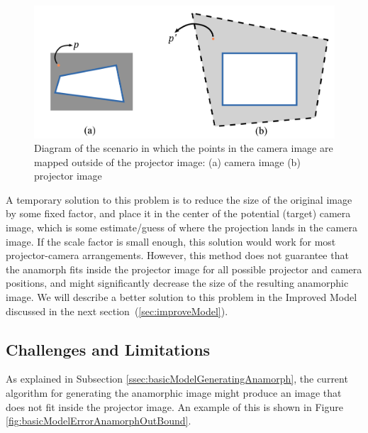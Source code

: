 \documentclass[11pt, oneside, reqno]{book}
\begin{document}
\begin{figure}[ht]
\centering
\includegraphics[width=.9\linewidth]{data/result_rect/projection_out_of_bound}
\caption{Diagram of the scenario in which the points in the camera image are mapped outside of the projector image: (a) camera image (b) projector image}
\label{fig:basicModelProjectionOutOfBound}
\end{figure}


A temporary solution to this problem is to reduce the size of the original image by some fixed factor, and place it in the center of the potential (target) camera image, which is some estimate/guess of where the projection lands in the camera image. 
If the scale factor is small enough, this solution would work for most projector-camera arrangements.
However, this method does not guarantee that the anamorph fits inside the projector image for all possible projector and camera positions, and might significantly decrease the size of the resulting anamorphic image.
We will describe a better solution to this problem in the Improved Model discussed in the next section~(\ref{sec:improveModel}).







\subsection{Challenges and Limitations}
\label{ssec:basicModelLimitations}

As explained in Subsection \ref{ssec:basicModelGeneratingAnamorph}, the current algorithm for generating the anamorphic image might produce an image that does not fit inside the projector image. An example of this is shown in Figure \ref{fig:basicModelErrorAnamorphOutBound}.
\end{document}
